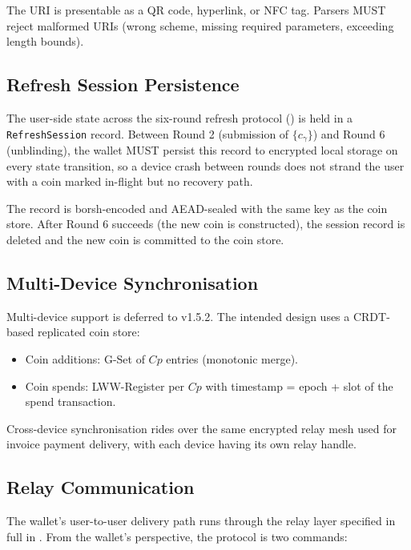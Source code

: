 The URI is presentable as a QR code, hyperlink, or NFC tag. Parsers MUST reject malformed URIs (wrong scheme, missing required parameters, exceeding length bounds).

\subsection{Refresh Session Persistence}
\label{sec:wallet-refresh-persistence}

The user-side state across the six-round refresh protocol () is held in a \texttt{RefreshSession} record. Between Round 2 (submission of $\{c_\gamma\}$) and Round 6 (unblinding), the wallet MUST persist this record to encrypted local storage on every state transition, so a device crash between rounds does not strand the user with a coin marked in-flight but no recovery path.

The record is borsh-encoded and AEAD-sealed with the same key as the coin store. After Round 6 succeeds (the new coin is constructed), the session record is deleted and the new coin is committed to the coin store.

\subsection{Multi-Device Synchronisation}
\label{sec:wallet-multi-device}

Multi-device support is deferred to v1.5.2. The intended design uses a CRDT-based replicated coin store:

\begin{itemize}[leftmargin=2em,itemsep=0pt]
  \item Coin additions: G-Set of $Cp$ entries (monotonic merge).
  \item Coin spends: LWW-Register per $Cp$ with timestamp = epoch + slot of the spend transaction.
\end{itemize}

Cross-device synchronisation rides over the same encrypted relay mesh used for invoice payment delivery, with each device having its own relay handle.

\subsection{Relay Communication}
\label{sec:wallet-relay}

The wallet's user-to-user delivery path runs through the relay layer
specified in full in . From the wallet's perspective,
the protocol is two commands:

